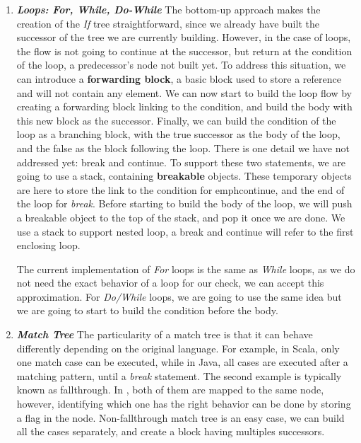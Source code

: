 \begin{enumerate}
	\item \textbf{\textit{Loops: For, While, Do-While}} \newline 
	\label{subsubsec:loops_cfg}
	The bottom-up approach makes the creation of the \emph{If} tree straightforward, since we already have built the successor of the tree we are currently building. 
	However, in the case of loops, the flow is not going to continue at the successor, but return at the condition of the loop, a predecessor’s node not built yet.
	To address this situation, we can introduce a \textbf{forwarding block}, a basic block used to store a reference and will not contain any element.
	We can now start to build the loop flow by creating a forwarding block linking to the condition, and build the body with this new block as the successor. 
	Finally, we can build the condition of the loop as a branching block, with the true successor as the body of the loop, and the false as the block following the loop.
	There is one detail we have not addressed yet: break and continue.
	To support these two statements, we are going to use a stack, containing \textbf{breakable} objects. 
	These temporary objects are here to store the link to the condition for emph{continue}, and the end of the loop for \emph{break}.
	Before starting to build the body of the loop, we will push a breakable object to the top of the stack, and pop it once we are done. 
	We use a stack to support nested loop, a break and continue will refer to the first enclosing loop.
	
	The current implementation of \emph{For} loops is the same as \emph{While} loops, as we do not need the exact behavior of a loop for our check, we can accept this approximation.
	For \emph{Do/While} loops, we are going to use the same idea but we are going to start to build the condition before the body.
	
	\item \textbf{\textit{Match Tree}} \newline 
	\label{subsubsec:match_tree_cfg}
	The particularity of a match tree is that it can behave differently depending on the original language.
	For example, in Scala, only one match case can be executed, while in Java, all cases are executed after a matching pattern, until a \emph{break} statement.
	The second example is typically known as fallthrough. 
	In \slang{}, both of them are mapped to the same node, however, identifying which one has the right behavior can be done by storing a flag in the node.
	Non-fallthrough match tree is an easy case, we can build all the cases separately, and create a block having multiples successors.
	

\end{enumerate}
